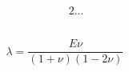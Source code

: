 \documentclass{article}
\begin{document}
\begin{alignat}{2}
  ...
\end{alignat}

\begin{equation}\label{eq:elas:C}
\end{equation}

\begin{equation}\label{eq:elas:lam-mu}
  \lambda = \frac{E \nu}{ (1+\nu)(1-2\nu)} \qquad
\end{equation}
\end{document}
